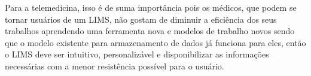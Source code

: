 Para a telemedicina, isso é de suma importância pois os médicos, que podem se tornar usuários de um LIMS, não gostam de diminuir a eficiência dos seus trabalhos aprendendo uma ferramenta nova e modelos de trabalho novos sendo que o modelo existente para armazenamento de dados já funciona para eles, então o LIMS deve ser intuitivo, personalizável e disponibilizar as informações necessárias com a menor resistência possível para o usuário.